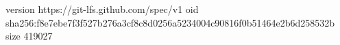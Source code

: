 version https://git-lfs.github.com/spec/v1
oid sha256:f8e7ebe7f3f527b276a3cf8c8d0256a5234004c90816f0b51464e2b6d258532b
size 419027
